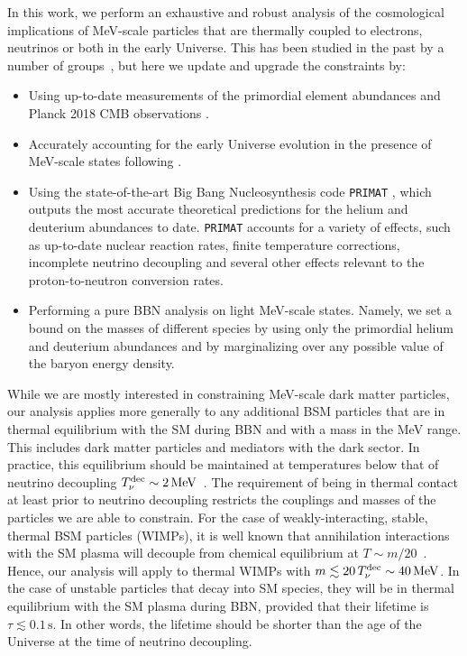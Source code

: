 \documentclass[notitlepage,letterpaper,natbib,aps,prd,onecolumn,amsmath,amsfonts,nofootinbib,preprintnumbers,superscriptaddress,secnumarabic,groupedaddress]{revtex4-1}
\begin{document}
In this work, we perform an exhaustive and robust analysis of the cosmological implications of MeV-scale particles that are thermally coupled to electrons, neutrinos or both in the early Universe. This has been studied in the past by a number of groups~\cite{Kolb:1986nf,Serpico:2004nm,Boehm:2013jpa,Nollett:2013pwa,Nollett:2014lwa,Boehm:2012gr,Ho:2012ug,Wilkinson:2016gsy,Depta:2019lbe,Escudero:2018mvt}, but here we update and upgrade the constraints by:
\begin{itemize}[leftmargin=0.5cm,itemsep=0pt]
\item Using up-to-date measurements of the primordial element abundances \cite{pdg} and Planck 2018 CMB observations \cite{Aghanim:2018eyx}.
\item Accurately accounting for the early Universe evolution in the presence of MeV-scale states following \cite{Escudero:2018mvt,Escudero:2019new}.
\item Using the state-of-the-art Big Bang Nucleosynthesis code \texttt{PRIMAT} \cite{Pitrou:2018cgg}, which outputs the most accurate theoretical predictions for the helium and deuterium abundances to date. \texttt{PRIMAT} accounts for a variety of effects, such as up-to-date nuclear reaction rates, finite temperature corrections, incomplete neutrino decoupling and several other effects relevant to the proton-to-neutron conversion rates.
\item Performing a pure BBN analysis on light MeV-scale states. Namely, we set a bound on the masses of different species by using only the primordial helium and deuterium abundances and by marginalizing over any possible value of the baryon energy density.
\end{itemize}
While we are mostly interested in constraining MeV-scale dark matter particles, our analysis applies more generally to any additional BSM particles that are in thermal equilibrium with the SM during BBN and with a mass in the MeV range. This includes dark matter particles and mediators with the dark sector. In practice, this equilibrium should be maintained at temperatures below that of neutrino decoupling $T_\nu^{\rm dec} \sim 2\,\text{MeV}$~\cite{Dolgov:2002wy}. The requirement of being in thermal contact at least prior to neutrino decoupling restricts the couplings and masses of the particles we are able to constrain. For the case of weakly-interacting, stable, thermal BSM particles (WIMPs), it is well known that annihilation interactions with the SM plasma will decouple from chemical equilibrium at $T \sim m/20$~\cite{Kolb:1990vq}. Hence, our analysis will apply to thermal WIMPs with $m \lesssim 20\, T_\nu ^{\rm dec} \sim 40\,\text{MeV}$. In the case of unstable particles that decay into SM species, they will be in thermal equilibrium with the SM plasma during BBN, provided that their lifetime is $\tau \lesssim 0.1 \,\text{s}$. In other words, the lifetime should be shorter than the age of the Universe at the time of neutrino decoupling.
\end{document}
